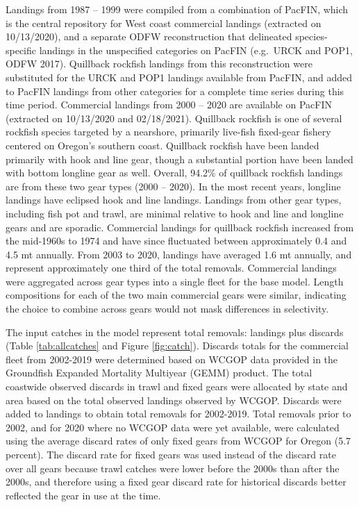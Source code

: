 \documentclass[11pt,
  english,
  a4paper,
]{article}
\begin{document}
Landings from 1987 -- 1999 were compiled from a combination of PacFIN, which is the central repository for West coast commercial landings (extracted on 10/13/2020), and a separate ODFW reconstruction that delineated species-specific landings in the unspecified categories on PacFIN (e.g.~URCK and POP1, ODFW 2017). Quillback rockfish landings from this reconstruction were substituted for the URCK and POP1 landings available from PacFIN, and added to PacFIN landings from other categories for a complete time series during this time period. Commercial landings from 2000 -- 2020 are available on PacFIN (extracted on 10/13/2020 and 02/18/2021). Quillback rockfish is one of several rockfish species targeted by a nearshore, primarily live-fish fixed-gear fishery centered on Oregon's southern coast. Quillback rockfish have been landed primarily with hook and line gear, though a substantial portion have been landed with bottom longline gear as well. Overall, 94.2\% of quillback rockfish landings are from these two gear types (2000 -- 2020). In the most recent years, longline landings have eclipsed hook and line landings. Landings from other gear types, including fish pot and trawl, are minimal relative to hook and line and longline gears and are sporadic. Commercial landings for quillback rockfish increased from the mid-1960s to 1974 and have since fluctuated between approximately 0.4 and 4.5 mt annually. From 2003 to 2020, landings have averaged 1.6 mt annually, and represent approximately one third of the total removals. Commercial landings were aggregated across gear types into a single fleet for the base model. Length compositions for each of the two main commercial gears were similar, indicating the choice to combine across gears would not mask differences in selectivity.

\leavevmode\tagmcend\tagstructend\par


The input catches in the model represent total removals: landings plus discards (Table \ref{tab:allcatches} and Figure \ref{fig:catch}). Discards totals for the commercial fleet from 2002-2019 were determined based on WCGOP data provided in the Groundfish Expanded Mortality Multiyear (GEMM) product. The total coastwide observed discards in trawl and fixed gears were allocated by state and area based on the total observed landings observed by WCGOP. Discards were added to landings to obtain total removals for 2002-2019. Total removals prior to 2002, and for 2020 where no WCGOP data were yet available, were calculated using the average discard rates of only fixed gears from WCGOP for Oregon (5.7 percent). The discard rate for fixed gears was used instead of the discard rate over all gears because trawl catches were lower before the 2000s than after the 2000s, and therefore using a fixed gear discard rate for historical discards better reflected the gear in use at the time.
\end{document}
